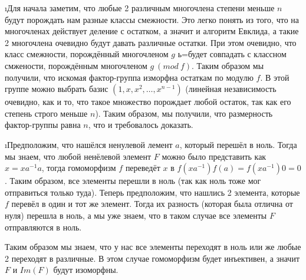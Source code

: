\i Для начала заметим, что любые 2 различным многочлена степени меньше $n$ будут порождать нам разные классы смежности. Это легко понять из того, что на многочленах действует деление с остатком, а значит и алгоритм Евклида, а такие 2 многочлена очевидно будут давать различные остатки. При этом очевидно, что класс смежности, порождённый многочленом $g$ ь=будет совпадать с классном смжености, порождённым многочленом $g\ (mod\ f)$. Таким образом мы получили, что искомая фактор-группа изморфна остаткам по модулю $f$. В этой группе можно выбрать базис $(1, x, x^2, \ldots, x^{n-1})$ (линейная независимость очевидно, как и то, что такое множество порождает любой остаток, так как его степень строго меньше $n$). Таким образом, мы получили, что размерность фактор-группы равна $n$, что и требовалось доказать.

\i Предположим, что нашёлся ненулевой лемент $a$, который перешёл в ноль. Тогда мы знаем, что любой ненёлевой элемент $F$ можно было представить как $x = xa^{-1}a$, тогда гомоморфизм $f$ переведёт $x$ в $f(xa^{-1})f(a) = f(xa^{-1})0 = 0$. Таким образом, все элементы перешли в ноль (так как ноль тоже мог отправиться только туда). Теперь предположим, что нашлись 2 элемента, которые $f$ перевёл в один и тот же элемент. Тогда их разность (которая была отлична от нуля) перешла в ноль, а мы уже знаем, что в таком случае все элементы $F$ отправляются в ноль.
\par Таким образом мы знаем, что у нас все элементы переходят в ноль или же любые 2 переходят в различные. В этом случае гомоморфизм будет инъективен, а значит $F$ и $Im(F)$ будут изоморфны.  